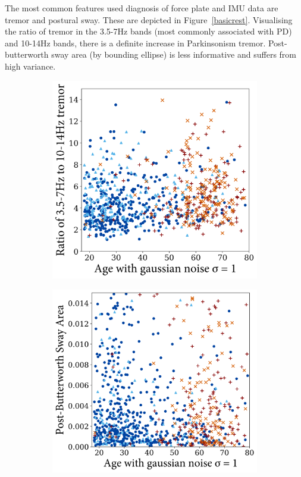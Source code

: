 \documentclass[12pt, twoside]{book}
\begin{document}
The most common features used diagnosis of force plate and IMU data are tremor and postural sway. These are depicted in Figure~\ref{basicrest}. Visualising the ratio of tremor in the 3.5-7Hz bands (most commonly associated with PD) and 10-14Hz bands, there is a definite increase in Parkinsonism tremor. Post-butterworth sway area (by bounding ellipse) is less informative and suffers from high variance.

\begin{figure}[h]
	\centering
	\begin{subfigure}{.42\textwidth}
		\centering
		\includegraphics[width=0.96\linewidth]{resttremor.png}
	\end{subfigure}%
	\begin{subfigure}{.42\textwidth}
		\centering
		\includegraphics[width=0.96\linewidth]{bwswayarea.png}

\end{subfigure}
\end{figure}
\end{document}
